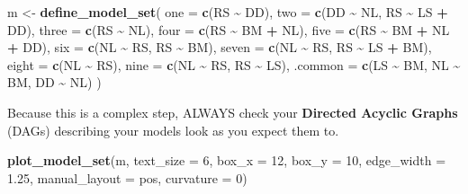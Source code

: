 \documentclass[
]{book}
\newenvironment{Shaded}{\begin{snugshade}}{\end{snugshade}}
\newcommand{\DataTypeTok}[1]{\textcolor[rgb]{0.13,0.29,0.53}{#1}}
\newcommand{\DecValTok}[1]{\textcolor[rgb]{0.00,0.00,0.81}{#1}}
\newcommand{\FloatTok}[1]{\textcolor[rgb]{0.00,0.00,0.81}{#1}}
\newcommand{\KeywordTok}[1]{\textcolor[rgb]{0.13,0.29,0.53}{\textbf{#1}}}
\newcommand{\NormalTok}[1]{#1}
\newcommand{\OperatorTok}[1]{\textcolor[rgb]{0.81,0.36,0.00}{\textbf{#1}}}
\newcommand{\StringTok}[1]{\textcolor[rgb]{0.31,0.60,0.02}{#1}}
\begin{document}
\begin{Shaded}
\begin{Highlighting}[]
\NormalTok{m \textless{}{-}}\StringTok{ }\KeywordTok{define\_model\_set}\NormalTok{(}
  \DataTypeTok{one   =} \KeywordTok{c}\NormalTok{(RS }\OperatorTok{\textasciitilde{}}\StringTok{ }\NormalTok{DD),}
  \DataTypeTok{two   =} \KeywordTok{c}\NormalTok{(DD }\OperatorTok{\textasciitilde{}}\StringTok{ }\NormalTok{NL, RS }\OperatorTok{\textasciitilde{}}\StringTok{ }\NormalTok{LS }\OperatorTok{+}\StringTok{ }\NormalTok{DD),}
  \DataTypeTok{three =} \KeywordTok{c}\NormalTok{(RS }\OperatorTok{\textasciitilde{}}\StringTok{ }\NormalTok{NL),}
  \DataTypeTok{four  =} \KeywordTok{c}\NormalTok{(RS }\OperatorTok{\textasciitilde{}}\StringTok{ }\NormalTok{BM }\OperatorTok{+}\StringTok{ }\NormalTok{NL),}
  \DataTypeTok{five  =} \KeywordTok{c}\NormalTok{(RS }\OperatorTok{\textasciitilde{}}\StringTok{ }\NormalTok{BM }\OperatorTok{+}\StringTok{ }\NormalTok{NL }\OperatorTok{+}\StringTok{ }\NormalTok{DD),}
  \DataTypeTok{six   =} \KeywordTok{c}\NormalTok{(NL }\OperatorTok{\textasciitilde{}}\StringTok{ }\NormalTok{RS, RS }\OperatorTok{\textasciitilde{}}\StringTok{ }\NormalTok{BM),}
  \DataTypeTok{seven =} \KeywordTok{c}\NormalTok{(NL }\OperatorTok{\textasciitilde{}}\StringTok{ }\NormalTok{RS, RS }\OperatorTok{\textasciitilde{}}\StringTok{ }\NormalTok{LS }\OperatorTok{+}\StringTok{ }\NormalTok{BM),}
  \DataTypeTok{eight =} \KeywordTok{c}\NormalTok{(NL }\OperatorTok{\textasciitilde{}}\StringTok{ }\NormalTok{RS),}
  \DataTypeTok{nine  =} \KeywordTok{c}\NormalTok{(NL }\OperatorTok{\textasciitilde{}}\StringTok{ }\NormalTok{RS, RS }\OperatorTok{\textasciitilde{}}\StringTok{ }\NormalTok{LS),}
  \DataTypeTok{.common =} \KeywordTok{c}\NormalTok{(LS }\OperatorTok{\textasciitilde{}}\StringTok{ }\NormalTok{BM, NL }\OperatorTok{\textasciitilde{}}\StringTok{ }\NormalTok{BM, DD }\OperatorTok{\textasciitilde{}}\StringTok{ }\NormalTok{NL)}
\NormalTok{)}
\end{Highlighting}
\end{Shaded}

Because this is a complex step, ALWAYS check your \textbf{Directed Acyclic Graphs} (DAGs) describing your models look as you expect them to.

\begin{Shaded}
\begin{Highlighting}[]
\KeywordTok{plot\_model\_set}\NormalTok{(m, }\DataTypeTok{text\_size =} \DecValTok{6}\NormalTok{, }\DataTypeTok{box\_x =} \DecValTok{12}\NormalTok{, }\DataTypeTok{box\_y =} \DecValTok{10}\NormalTok{,}
               \DataTypeTok{edge\_width =} \FloatTok{1.25}\NormalTok{, }\DataTypeTok{manual\_layout =}\NormalTok{ pos, }\DataTypeTok{curvature =} \DecValTok{0}\NormalTok{)}
\end{Highlighting}
\end{Shaded}
\end{document}
